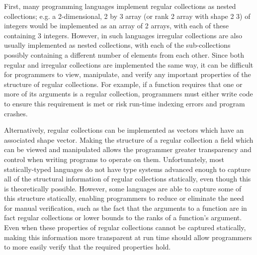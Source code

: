 First, many programming languages implement regular collections as nested collections;
e.g. a 2-dimensional, 2 by 3 array (or rank 2 array with shape 2 3) of integers would be implemented as 
an array of 2 arrays, with each of these containing 3 integers. %
However, in such languages irregular collections are also usually implemented as nested collections, 
with each of the sub-collections possibly containing a different number of elements from each other.
Since both regular and irregular collections are implemented the same way,
it can be difficult for programmers to view, manipulate, and verify any important properties of the structure of regular collections.
For example, if a function requires that one or more of its arguments is a regular collection, 
programmers must either write code to ensure this requirement is met %
or risk run-time indexing errors and program crashes.

Alternatively, regular collections can be implemented as vectors which have an associated shape vector. 
Making the structure of a regular collection a field which can be viewed and manipulated 
allows the programmer greater transparency and control when writing programs to operate on them.
Unfortunately, most statically-typed languages do not have type systems advanced enough 
to capture all of the structural information of regular collections statically, even though this is theoretically possible. %
However, some languages are able to capture some of this structure statically, \cite{boost} \cite{sac} \cite{dph}
enabling programmers to reduce or eliminate the need for manual verification, 
such as the fact that the arguments to a function are in fact regular collections or lower bounds to the ranks of a function's argument.
Even when these properties of regular collections cannot be captured statically, making this information more transparent at run time 
should allow programmers to more easily verify that the required properties hold.

